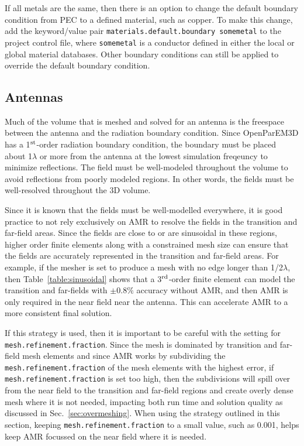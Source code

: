 \documentclass[titlepage]{article}
\renewcommand\_{\textunderscore\linebreak[1]}
\begin{document}
If all metals are the same, then there is an option to change the default boundary condition from PEC to a defined material, such as copper.  To make this change, add the keyword/value pair \newline\texttt{materials.default.boundary some\_metal} to the project control file, where \texttt{some\_metal} is a conductor defined in either the local or global material databases.  Other boundary conditions can still be applied to override the default boundary condition.

\subsection{Antennas}

Much of the volume that is meshed and solved for an antenna is the freespace between the antenna and the radiation boundary condition.  Since OpenParEM3D has a 1$^{\textnormal{st}}$-order radiation boundary condition, the boundary must be placed about 1$\lambda$ or more from the antenna at the lowest simulation freqeuncy to minimize reflections.  The field must be well-modeled throughout the volume to avoid reflections from poorly modeled regions.  In other words, the fields must be well-resolved throughout the 3D volume.

Since it is known that the fields must be well-modelled everywhere, it is good practice to not rely exclusively on AMR to resolve the fields in the transition and far-field areas.  Since the fields are close to or are sinusoidal in these regions, higher order finite elements along with a constrained mesh size can ensure that the fields are accurately represented in the transition and far-field areas.  For example, if the mesher is set to produce a mesh with no edge longer than 1/2$\lambda$, then Table~\ref{table:sinusoidal} shows that a 3$^{\textnormal{rd}}$-order finite element can model the transition and far-fields with $\pm 0.8\%$ accuracy without AMR, and then AMR is only required in the near field near the antenna.  This can accelerate AMR to a more consistent final solution.

If this strategy is used, then it is important to be careful with the setting for \texttt{mesh.refinement.fraction}.  Since the mesh is dominated by transition and far-field mesh elements and since AMR works by subdividing the \texttt{mesh.refinement.fraction} of the mesh elements with the highest error, if \texttt{mesh.refinement.fraction} is set too high, then the subdivisions will spill over from the near field to the transition and far-field regions and create overly dense mesh where it is not needed, impacting both run time and solution quality as discussed in Sec.~\ref{sec:overmeshing}. When using the strategy outlined in this section, keeping \texttt{mesh.refinement.fraction} to a small value, such as 0.001, helps keep AMR focussed on the near field where it is needed. 
\end{document}
